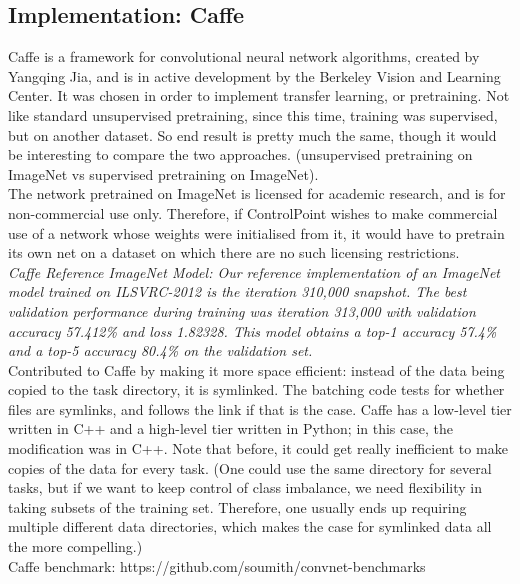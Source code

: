 \documentclass[a4paper,11pt]{article}
\begin{document}
\subsection{Implementation: Caffe}

Caffe is a framework for convolutional neural network algorithms, created by Yangqing Jia, and is in active development by the Berkeley Vision and Learning Center. It was chosen in order to implement transfer learning, or pretraining. Not like standard unsupervised pretraining, since this time, training was supervised, but on another dataset. So end result is pretty much the same, though it would be interesting to compare the two approaches. (unsupervised pretraining on ImageNet vs supervised pretraining on ImageNet). \\
 
The network pretrained on ImageNet is licensed for academic research, and is for non-commercial use only. Therefore, if ControlPoint wishes to make commercial use of a network whose weights were initialised from it, it would have to pretrain its own net on a dataset on which there are no such licensing restrictions. \\


\textit{Caffe Reference ImageNet Model: Our reference implementation of an ImageNet model trained on ILSVRC-2012 is the iteration 310,000 snapshot. The best validation performance during training was iteration 313,000 with validation accuracy 57.412\% and loss 1.82328. This model obtains a top-1 accuracy 57.4\% and a top-5 accuracy 80.4\% on the validation set.} \cite{caffe-website} \\

Contributed to Caffe by making it more space efficient: instead of the data being copied to the task directory, it is symlinked. The batching code tests for whether files are symlinks, and follows the link if that is the case. Caffe has a low-level tier written in C++ and a high-level tier written in Python; in this case, the modification was in C++. Note that before, it could get really inefficient to make copies of the data for every task. (One could use the same directory for several tasks, but if we want to keep control of class imbalance, we need flexibility in taking subsets of the training set. Therefore, one usually ends up requiring multiple different data directories, which makes the case for symlinked data all the more compelling.) \\

Caffe benchmark: https://github.com/soumith/convnet-benchmarks 
\end{document}
